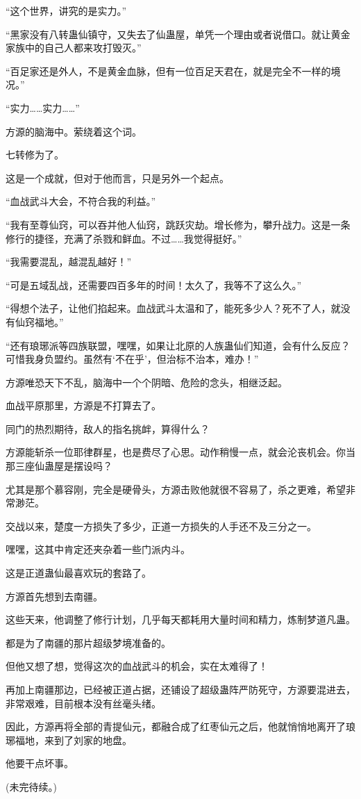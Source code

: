 \begin{this_body}
“这个世界，讲究的是实力。”

“黑家没有八转蛊仙镇守，又失去了仙蛊屋，单凭一个理由或者说借口。就让黄金家族中的自己人都来攻打毁灭。”

“百足家还是外人，不是黄金血脉，但有一位百足天君在，就是完全不一样的境况。”

“实力……实力……”

方源的脑海中。萦绕着这个词。

七转修为了。

这是一个成就，但对于他而言，只是另外一个起点。

“血战武斗大会，不符合我的利益。”

“我有至尊仙窍，可以吞并他人仙窍，跳跃灾劫。增长修为，攀升战力。这是一条修行的捷径，充满了杀戮和鲜血。不过……我觉得挺好。”

“我需要混乱，越混乱越好！”

“可是五域乱战，还需要四百多年的时间！太久了，我等不了这么久。”

“得想个法子，让他们掐起来。血战武斗太温和了，能死多少人？死不了人，就没有仙窍福地。”

“还有琅琊派等四族联盟，嘿嘿，如果让北原的人族蛊仙们知道，会有什么反应？可惜我身负盟约。虽然有‘不在乎’，但治标不治本，难办！”

方源唯恐天下不乱，脑海中一个个阴暗、危险的念头，相继泛起。

血战平原那里，方源是不打算去了。

同门的热烈期待，敌人的指名挑衅，算得什么？

方源能斩杀一位耶律群星，也是费尽了心思。动作稍慢一点，就会沦丧机会。你当那三座仙蛊屋是摆设吗？

尤其是那个慕容刚，完全是硬骨头，方源击败他就很不容易了，杀之更难，希望非常渺茫。

交战以来，楚度一方损失了多少，正道一方损失的人手还不及三分之一。

嘿嘿，这其中肯定还夹杂着一些门派内斗。

这是正道蛊仙最喜欢玩的套路了。

方源首先想到去南疆。

这些天来，他调整了修行计划，几乎每天都耗用大量时间和精力，炼制梦道凡蛊。

都是为了南疆的那片超级梦境准备的。

但他又想了想，觉得这次的血战武斗的机会，实在太难得了！

再加上南疆那边，已经被正道占据，还铺设了超级蛊阵严防死守，方源要混进去，非常艰难，目前根本没有丝毫头绪。

因此，方源再将全部的青提仙元，都融合成了红枣仙元之后，他就悄悄地离开了琅琊福地，来到了刘家的地盘。

他要干点坏事。

(未完待续。)

\end{this_body}

